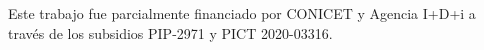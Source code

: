 \documentclass[baaa]{baaa}
\begin{document}
\begin{acknowledgement}
Este trabajo fue parcialmente financiado por CONICET y Agencia I+D+i a través de los subsidios PIP-2971
y PICT 2020-03316.
\end{acknowledgement}



\small

 
\end{document}
